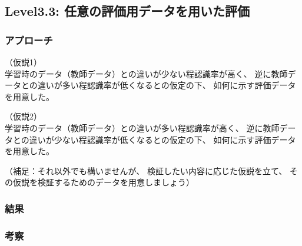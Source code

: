 \subsection{Level3.3: 任意の評価用データを用いた評価}
\subsubsection{アプローチ}
（仮説1）\\
学習時のデータ（教師データ）との違いが少ない程認識率が高く、
逆に教師データとの違いが多い程認識率が低くなるとの仮定の下、
如何に示す評価データを用意した。

（仮説2）\\
学習時のデータ（教師データ）との違いが多い程認識率が高く、
逆に教師データとの違いが少ない程認識率が低くなるとの仮定の下、
如何に示す評価データを用意した。

（補足：それ以外でも構いませんが、
検証したい内容に応じた仮説を立て、
その仮説を検証するためのデータを用意しましょう）

\subsubsection{結果}

\subsubsection{考察}

